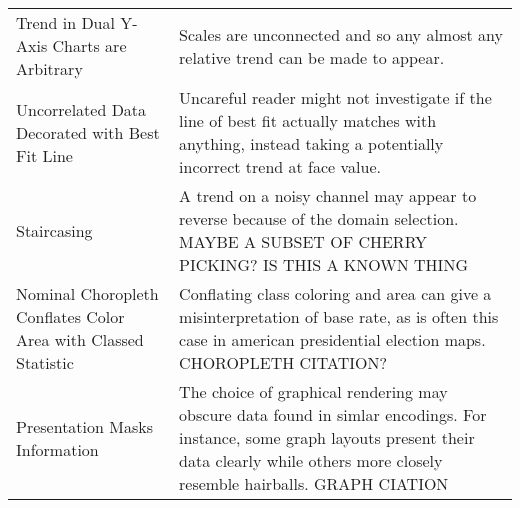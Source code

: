 \begin{table*}[]
\begin{tabular}{p{5cm}p{12cm}}
 \rowcolor{colorc-opaque}Trend in Dual Y-Axis Charts are Arbitrary & Scales are unconnected and so any almost any relative trend can be made to appear. \cite{KindlmannAlgebraicVisPedagogyPDV2016, cairo2015graphics}\\
 \rowcolor{colorc}Uncorrelated Data Decorated with Best Fit Line & Uncareful reader might not investigate if the line of best fit actually matches with anything, instead taking a potentially incorrect trend at face value. \\
 \rowcolor{colorc-opaque}Staircasing & A trend on a noisy channel may appear to reverse because of the domain selection. MAYBE A SUBSET OF CHERRY PICKING? IS THIS A KNOWN THING\\
 \rowcolor{colorc}Nominal Choropleth Conflates Color Area with Classed Statistic & Conflating class coloring and area can give a misinterpretation of base rate, as is often this case in american presidential election maps.  \cite{gastner2005maps} CHOROPLETH CITATION?\\
 \rowcolor{colorc-opaque}Presentation Masks Information & The choice of graphical rendering may obscure data found in simlar encodings. For instance, some graph layouts present their data clearly while others more closely resemble hairballs. \cite{hofmann2012graphical} GRAPH CIATION\\


\end{tabular}
\end{table*}
